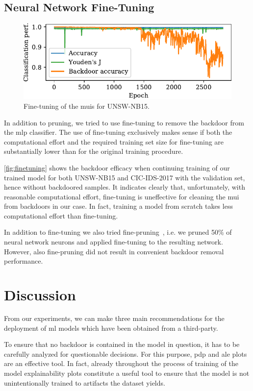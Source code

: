 \documentclass[10pt,sigconf,letterpaper,dvipsnames]{acmart}
\newcommand\note[2]{{\color{#1}#2}}
\newcommand\todo[1]{{\note{red}{TODO: #1}}}
\newcommand{\unsw}{UNSW-NB15}
\newcommand{\cic}{CIC-IDS-2017}
\begin{document}
\subsection{Neural Network Fine-Tuning}
\begin{figure}[t]
\includegraphics[width=\columnwidth]{figures/finetuning_2017.pdf}
\caption{Fine-tuning of the \glspl{mui} for \unsw{}.}
\label{fig:finetuning}
\end{figure}
In addition to pruning, we tried to use fine-tuning to remove the backdoor from the \gls{mlp} classifier.
The use of fine-tuning exclusively makes  sense if both the computational effort and the required training set size for fine-tuning are substantially lower than for the original training procedure. 

\autoref{fig:finetuning} shows the backdoor efficacy when continuing training of our trained model for both \unsw{} and \cic{} with the validation set, hence without backdoored samples.
It indicates clearly that, unfortunately, with reasonable computational effort, fine-tuning is uneffective for cleaning the \gls{mui} from backdoors in our case. In fact, training a model from scratch takes less computational effort than fine-tuning.

In addition to fine-tuning we also tried fine-pruning~\cite{liu_fine-pruning:_2018}, i.e. we pruned 50\% of neural network neurons and applied fine-tuning to the resulting network. However, also fine-pruning did not result in convenient backdoor removal performance.

\section{Discussion}
From our experiments, we can make three main recommendations for the deployment of \gls{ml} models which have been obtained from a third-party.

To ensure that no backdoor is contained in the model in question, it has to be carefully analyzed for questionable decisions. For this purpose, \gls{pdp} and \gls{ale} plots are an effective tool. In fact, already throughout the process of training of the model explainability plots constitute a useful tool to ensure that the model is not unintentionally trained  to artifacts the dataset yields.
\end{document}
